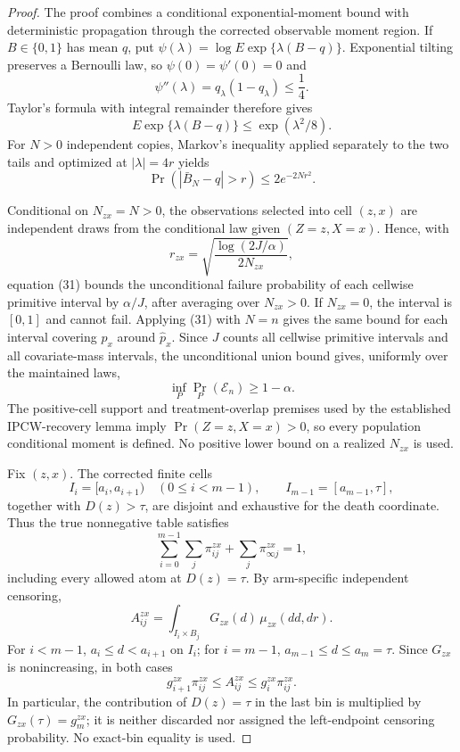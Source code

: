 \documentclass{article}
\begin{document}
\begin{proof}
The proof combines a conditional exponential-moment bound with deterministic propagation through the corrected observable moment region.  If \(B\in\{0,1\}\) has mean \(q\), put \(\psi(\lambda)=\log E\exp\{\lambda(B-q)\}\).  Exponential tilting preserves a Bernoulli law, so \(\psi(0)=\psi'(0)=0\) and
\[
\psi''(\lambda)=q_\lambda(1-q_\lambda)\leq\frac14.
\]
Taylor's formula with integral remainder therefore gives
\[
E\exp\{\lambda(B-q)\}\leq\exp(\lambda^2/8).
\]
For \(N>0\) independent copies, Markov's inequality applied separately to the two tails and optimized at \(|\lambda|=4r\) yields
\[
\Pr(|\bar B_N-q|>r)\leq2e^{-2Nr^2}.                                  \tag{31}
\]

Conditional on \(N_{zx}=N>0\), the observations selected into cell \((z,x)\) are independent draws from the conditional law given \((Z=z,X=x)\).  Hence, with
\[
r_{zx}=\sqrt{\frac{\log(2J/\alpha)}{2N_{zx}}},
\]
equation (31) bounds the unconditional failure probability of each cellwise primitive interval by \(\alpha/J\), after averaging over \(N_{zx}>0\).  If \(N_{zx}=0\), the interval is \([0,1]\) and cannot fail.  Applying (31) with \(N=n\) gives the same bound for each interval covering \(p_x\) around \(\widehat p_x\).  Since \(J\) counts all cellwise primitive intervals and all covariate-mass intervals, the unconditional union bound gives, uniformly over the maintained laws,
\[
\inf_P\Pr_P(\mathscr E_n)\geq1-\alpha.                               \tag{32}
\]
The positive-cell support and treatment-overlap premises used by the established IPCW-recovery lemma imply \(\Pr(Z=z,X=x)>0\), so every population conditional moment is defined.  No positive lower bound on a realized \(N_{zx}\) is used.

Fix \((z,x)\).  The corrected finite cells
\[
I_i=[a_i,a_{i+1})\quad(0\leq i<m-1),
\qquad I_{m-1}=[a_{m-1},\tau],
\]
together with \(D(z)>\tau\), are disjoint and exhaustive for the death coordinate.  Thus the true nonnegative table satisfies
\[
\sum_{i=0}^{m-1}\sum_j\pi^{zx}_{ij}+\sum_j\pi^{zx}_{\infty j}=1,       \tag{33}
\]
including every allowed atom at \(D(z)=\tau\).  By arm-specific independent censoring,
\[
A^{zx}_{ij}=\int_{I_i\times B_j}G_{zx}(d)\,\mu_{zx}(d d,d r).
\]
For \(i<m-1\), \(a_i\leq d<a_{i+1}\) on \(I_i\); for \(i=m-1\), \(a_{m-1}\leq d\leq a_m=\tau\).  Since \(G_{zx}\) is nonincreasing, in both cases
\[
g^{zx}_{i+1}\pi^{zx}_{ij}
\leq A^{zx}_{ij}
\leq g^{zx}_i\pi^{zx}_{ij}.                                         \tag{34}
\]
In particular, the contribution of \(D(z)=\tau\) in the last bin is multiplied by \(G_{zx}(\tau)=g^{zx}_m\); it is neither discarded nor assigned the left-endpoint censoring probability.  No exact-bin equality is used.


\end{proof}
\end{document}
